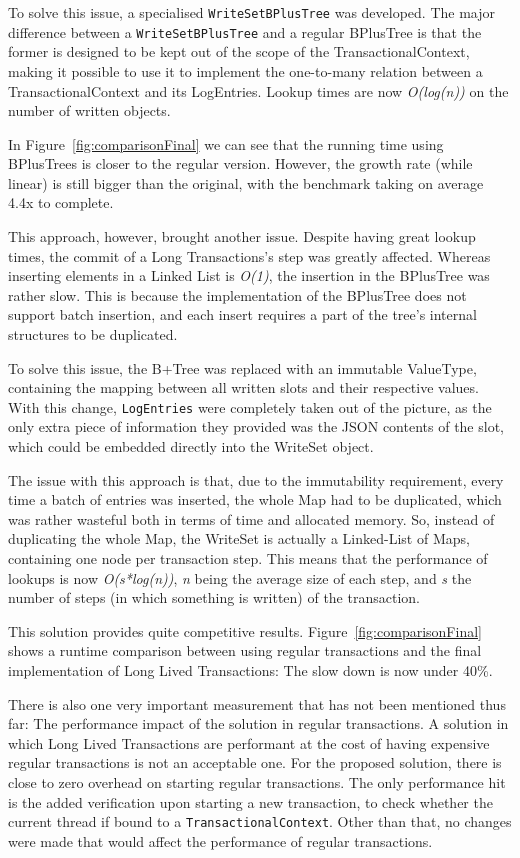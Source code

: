 \documentclass{llncs}
\begin{document}
To solve this issue, a specialised \texttt{WriteSetBPlusTree} was
developed. The major difference between a \texttt{WriteSetBPlusTree}
and a regular BPlusTree is that the former is designed to be kept out
of the scope of the TransactionalContext, making it possible to use it
to implement the one-to-many relation between a TransactionalContext
and its LogEntries. Lookup times are now {\it O(log(n))} on the number
of written objects.

In Figure~\ref{fig:comparisonFinal} we can see that the running time
using BPlusTrees is closer to the regular version. However, the growth
rate (while linear) is still bigger than the original, with the
benchmark taking on average 4.4x to complete.

This approach, however, brought another issue. Despite having great
lookup times, the commit of a Long Transactions's step was greatly
affected. Whereas inserting elements in a Linked List is {\it O(1)},
the insertion in the BPlusTree was rather slow. This is because the
implementation of the BPlusTree does not support batch insertion, and
each insert requires a part of the tree's internal structures to be
duplicated.

To solve this issue, the B+Tree was replaced with an immutable
ValueType, containing the mapping between all written slots and their
respective values. With this change, \texttt{LogEntries} were
completely taken out of the picture, as the only extra piece of
information they provided was the JSON contents of the slot, which
could be embedded directly into the WriteSet object.

The issue with this approach is that, due to the immutability
requirement, every time a batch of entries was inserted, the whole Map
had to be duplicated, which was rather wasteful both in terms of time
and allocated memory. So, instead of duplicating the whole Map, the
WriteSet is actually a Linked-List of Maps, containing one node per
transaction step. This means that the performance of lookups is now
{\it O(s*log(n))}, {\it n} being the average size of each step, and
{\it s} the number of steps (in which something is written) of the
transaction.

This solution provides quite competitive
results. Figure~\ref{fig:comparisonFinal} shows a runtime comparison
between using regular transactions and the final implementation of
Long Lived Transactions: The slow down is now under 40\%.

There is also one very important measurement that has not been
mentioned thus far: The performance impact of the solution in regular
transactions. A solution in which Long Lived Transactions are
performant at the cost of having expensive regular transactions is not
an acceptable one. For the proposed solution, there is close to zero
overhead on starting regular transactions. The only performance hit is
the added verification upon starting a new transaction, to check
whether the current thread if bound to a
\texttt{TransactionalContext}. Other than that, no changes were made
that would affect the performance of regular transactions.
\end{document}
